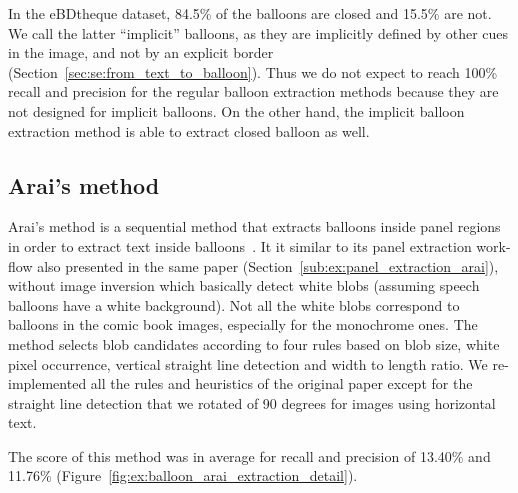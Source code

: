 In the eBDtheque dataset, 84.5\% of the balloons are closed and 15.5\% are not.
We call the latter ``implicit'' balloons, as they are implicitly defined by other cues in the image, and not by an explicit border (Section~\ref{sec:se:from_text_to_balloon}).
Thus we do not expect to reach 100\% recall and precision for the regular balloon extraction methods because they are not designed for implicit balloons.
On the other hand, the implicit balloon extraction method is able to extract closed balloon as well.



\subsection{Arai's method} %
\label{sub:ex:balloon_extraction_arai}

Arai's method is a sequential method that extracts balloons inside panel regions in order to extract text inside balloons~\cite{Arai11}.
It it similar to its panel extraction work-flow also presented in the same paper (Section~\ref{sub:ex:panel_extraction_arai}), without image inversion which basically detect white blobs (assuming speech balloons have a white background).
Not all the white blobs correspond to balloons in the comic book images, especially for the monochrome ones.
The method selects blob candidates according to four rules based on blob size, white pixel occurrence, vertical straight line detection and width to length ratio.
We re-implemented all the rules and heuristics of the original paper except for the straight line detection that we rotated of 90 degrees for images using horizontal text.

The score of this method was in average for recall and precision of 13.40\% and 11.76\% (Figure~\ref{fig:ex:balloon_arai_extraction_detail}).


